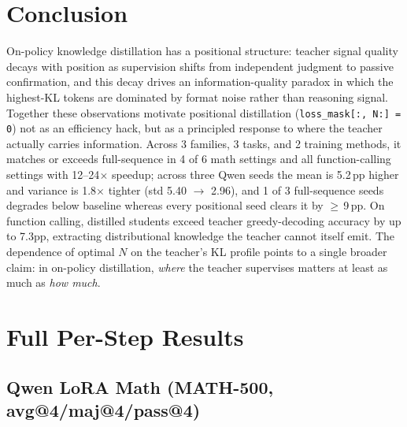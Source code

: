 \documentclass[10pt]{article}
\begin{document}
\section{Conclusion}

On-policy knowledge distillation has a positional structure: teacher signal quality decays with position as supervision shifts from independent judgment to passive confirmation, and this decay drives an information-quality paradox in which the highest-KL tokens are dominated by format noise rather than reasoning signal. Together these observations motivate positional distillation (\texttt{loss\_mask[:, N:] = 0}) not as an efficiency hack, but as a principled response to where the teacher actually carries information. Across 3 families, 3 tasks, and 2 training methods, it matches or exceeds full-sequence in 4 of 6 math settings and all function-calling settings with 12--24$\times$ speedup; across three Qwen seeds the mean is 5.2\,pp higher and variance is 1.8$\times$ tighter (std 5.40 $\to$ 2.96), and 1 of 3 full-sequence seeds degrades below baseline whereas every positional seed clears it by $\ge$\,9\,pp. On function calling, distilled students exceed teacher greedy-decoding accuracy by up to 7.3pp, extracting distributional knowledge the teacher cannot itself emit. The dependence of optimal $N$ on the teacher's KL profile points to a single broader claim: in on-policy distillation, \emph{where} the teacher supervises matters at least as much as \emph{how much}.






\newpage
\appendix

\section{Full Per-Step Results}
\label{app:perstep}

\subsection{Qwen LoRA Math (MATH-500, avg@4/maj@4/pass@4)}
\end{document}
